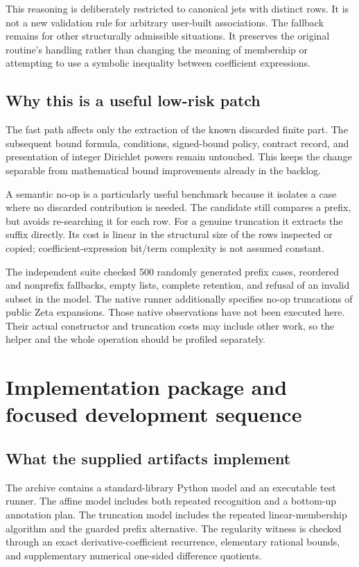 \documentclass[11pt,a4paper]{article}
\begin{document}
This reasoning is deliberately restricted to canonical jets with distinct
rows. It is not a new validation rule for arbitrary user-built associations.
The fallback remains for other structurally admissible situations. It preserves
the original routine's handling rather than changing the meaning of membership
or attempting to use a symbolic inequality between coefficient expressions.

\subsection{Why this is a useful low-risk patch}
The fast path affects only the extraction of the known discarded finite part.
The subsequent bound formula, conditions, signed-bound policy, contract record,
and presentation of integer Dirichlet powers remain untouched. This keeps the
change separable from mathematical bound improvements already in the backlog.

A semantic no-op is a particularly useful benchmark because it isolates a case
where no discarded contribution is needed. The candidate still compares a
prefix, but avoids re-searching it for each row. For a genuine truncation it
extracts the suffix directly. Its cost is linear in the structural size of the
rows inspected or copied; coefficient-expression bit/term complexity is not
assumed constant.

The independent suite checked 500 randomly generated prefix cases, reordered
and nonprefix fallbacks, empty lists, complete retention, and refusal of an
invalid subset in the model. The native runner additionally specifies no-op
truncations of public Zeta expansions. Those native observations have not been
executed here. Their actual constructor and truncation costs may include other
work, so the helper and the whole operation should be profiled separately.

\section{Implementation package and focused development sequence}
\subsection{What the supplied artifacts implement}
The archive contains a standard-library Python model and an executable test
runner. The affine model includes both repeated recognition and a bottom-up
annotation plan. The truncation model includes the repeated linear-membership
algorithm and the guarded prefix alternative. The regularity witness is checked
through an exact derivative-coefficient recurrence, elementary rational bounds,
and supplementary numerical one-sided difference quotients.
\end{document}
